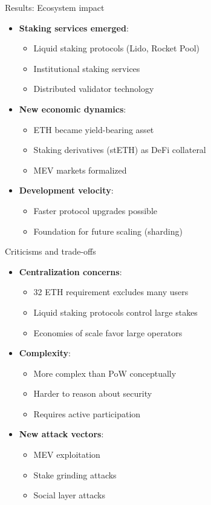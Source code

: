 \documentclass[aspectratio=169, lualatex, handout]{beamer}
\begin{document}
\begin{frame}{Results: Ecosystem impact}
	\begin{itemize}
		\item \textbf{Staking services emerged}:
		      \begin{itemize}
			      \item Liquid staking protocols (Lido, Rocket Pool)
			      \item Institutional staking services
			      \item Distributed validator technology
		      \end{itemize}
		\item \textbf{New economic dynamics}:
		      \begin{itemize}
			      \item ETH became yield-bearing asset
			      \item Staking derivatives (stETH) as DeFi collateral
			      \item MEV markets formalized
		      \end{itemize}
		\item \textbf{Development velocity}:
		      \begin{itemize}
			      \item Faster protocol upgrades possible
			      \item Foundation for future scaling (sharding)
		      \end{itemize}
	\end{itemize}
\end{frame}

\begin{frame}{Criticisms and trade-offs}
	\begin{itemize}
		\item \textbf{Centralization concerns}:
		      \begin{itemize}
			      \item 32 ETH requirement excludes many users
			      \item Liquid staking protocols control large stakes
			      \item Economies of scale favor large operators
		      \end{itemize}
		\item \textbf{Complexity}:
		      \begin{itemize}
			      \item More complex than PoW conceptually
			      \item Harder to reason about security
			      \item Requires active participation
		      \end{itemize}
		\item \textbf{New attack vectors}:
		      \begin{itemize}
			      \item MEV exploitation
			      \item Stake grinding attacks
			      \item Social layer attacks
		      \end{itemize}
	\end{itemize}
\end{frame}
\end{document}
